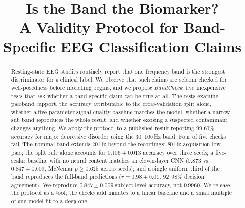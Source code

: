 \documentclass[10pt,conference]{IEEEtran}
\begin{document}
\title{Is the Band the Biomarker?\\
A Validity Protocol for Band-Specific EEG Classification Claims}

\author{
}

\maketitle

\begin{abstract}
Resting-state EEG studies routinely report that one frequency band is the
strongest discriminator for a clinical label. We observe that such claims are
seldom checked for well-posedness before modelling begins, and we propose
\emph{BandCheck}: five inexpensive tests that ask whether a band-specific claim
can be true at all. The tests examine passband support, the accuracy
attributable to the cross-validation split alone, whether a five-parameter
signal-quality baseline matches the model, whether a narrow sub-band reproduces
the whole result, and whether excising a suspected contaminant changes anything.
We apply the protocol to a published result reporting 99.60\% accuracy for major
depressive disorder using the 30--100\,Hz band. Four of five checks fail. The
nominal band extends 20\,Hz beyond the recordings' 80\,Hz acquisition low-pass;
the split rule alone accounts for $0.106\pm0.013$ accuracy over three seeds; a five-scalar baseline with no
neural content matches an eleven-layer CNN ($0.873$ vs $0.847\pm0.009$, McNemar
$p\geq0.625$ across seeds); and a single uniform third of the band reproduces the full-band
predictions ($r=0.98\pm0.01$, 92--98\% decision agreement). We reproduce $0.847\pm0.009$
subject-level accuracy, not $0.9960$. We release the protocol as a tool; the checks
add minutes to a linear baseline and a small multiple of one model fit to a deep
one.
\end{abstract}
\end{document}
